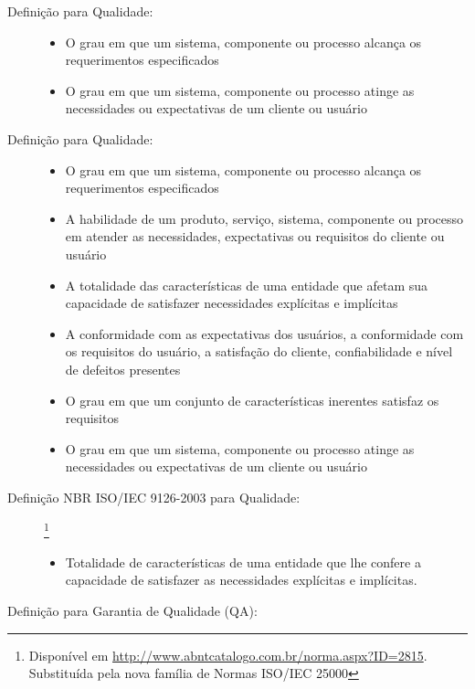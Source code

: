\documentclass[
	12pt,				%
	openright,			%
	twoside,			%
	a4paper,			%
	english,			%
	brazil,				%
	]{abntex2}
\begin{document}
\begin{description}
    \item[Definição  para Qualidade:] \hfill
        \begin{itemize}
            \item O grau em que um sistema, componente ou processo alcança os requerimentos especificados
            \item O grau em que um sistema, componente ou processo atinge as necessidades ou expectativas de um cliente ou usuário
        \end{itemize}
    \item[Definição  para Qualidade:] \hfill
        \begin{itemize}
            \item O grau em que um sistema, componente ou processo alcança os requerimentos especificados
            \item A habilidade de um produto, serviço, sistema, componente ou processo em atender as necessidades, expectativas ou requisitos do cliente ou usuário
            \item A totalidade das características de uma entidade que afetam sua capacidade de satisfazer necessidades explícitas e implícitas
            \item A conformidade com as expectativas dos usuários, a conformidade com os requisitos do usuário, a satisfação do cliente, confiabilidade e nível de defeitos presentes
            \item O grau em que um conjunto de características inerentes satisfaz os requisitos
            \item O grau em que um sistema, componente ou processo atinge as necessidades ou expectativas de um cliente ou usuário
        \end{itemize}
    \item[Definição NBR ISO/IEC 9126-2003 para Qualidade:]\footnote{Disponível em \url{http://www.abntcatalogo.com.br/norma.aspx?ID=2815}. Substituída pela nova família de Normas ISO/IEC 25000} %
        \begin{itemize}
            \item  Totalidade de características de uma entidade que lhe confere a capacidade de satisfazer as necessidades explícitas e implícitas.
        \end{itemize}
    \item[Definição  para Garantia de Qualidade (QA):] \hfill

\end{description}
\end{document}
